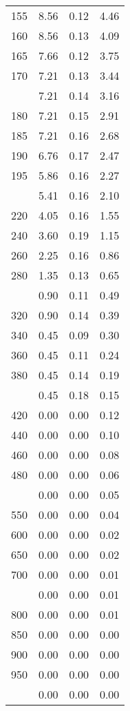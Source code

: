 \begin{table}[ht]
\begin{tabular}{lccc}
  155 & 8.56 & 0.12 & 4.46 \\ 
  160 & 8.56 & 0.13 & 4.09 \\ 
  165 & 7.66 & 0.12 & 3.75 \\ 
  170 & 7.21 & 0.13 & 3.44 \\ 
   \addlinespace
175 & 7.21 & 0.14 & 3.16 \\ 
  180 & 7.21 & 0.15 & 2.91 \\ 
  185 & 7.21 & 0.16 & 2.68 \\ 
  190 & 6.76 & 0.17 & 2.47 \\ 
  195 & 5.86 & 0.16 & 2.27 \\ 
   \addlinespace
200 & 5.41 & 0.16 & 2.10 \\ 
  220 & 4.05 & 0.16 & 1.55 \\ 
  240 & 3.60 & 0.19 & 1.15 \\ 
  260 & 2.25 & 0.16 & 0.86 \\ 
  280 & 1.35 & 0.13 & 0.65 \\ 
   \addlinespace
300 & 0.90 & 0.11 & 0.49 \\ 
  320 & 0.90 & 0.14 & 0.39 \\ 
  340 & 0.45 & 0.09 & 0.30 \\ 
  360 & 0.45 & 0.11 & 0.24 \\ 
  380 & 0.45 & 0.14 & 0.19 \\ 
   \addlinespace
400 & 0.45 & 0.18 & 0.15 \\ 
  420 & 0.00 & 0.00 & 0.12 \\ 
  440 & 0.00 & 0.00 & 0.10 \\ 
  460 & 0.00 & 0.00 & 0.08 \\ 
  480 & 0.00 & 0.00 & 0.06 \\ 
   \addlinespace
500 & 0.00 & 0.00 & 0.05 \\ 
  550 & 0.00 & 0.00 & 0.04 \\ 
  600 & 0.00 & 0.00 & 0.02 \\ 
  650 & 0.00 & 0.00 & 0.02 \\ 
  700 & 0.00 & 0.00 & 0.01 \\ 
   \addlinespace
750 & 0.00 & 0.00 & 0.01 \\ 
  800 & 0.00 & 0.00 & 0.01 \\ 
  850 & 0.00 & 0.00 & 0.00 \\ 
  900 & 0.00 & 0.00 & 0.00 \\ 
  950 & 0.00 & 0.00 & 0.00 \\ 
   \addlinespace
1000 & 0.00 & 0.00 & 0.00 \\ 
   \bottomrule
\end{tabular}
\end{table}

